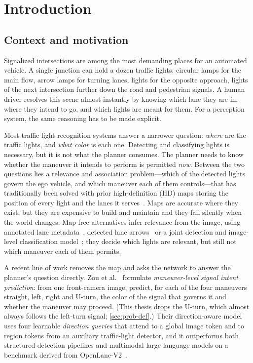 \chapter*{Introduction}

\section*{Context and motivation}

Signalized intersections are among the most demanding places for an automated vehicle. A single
junction can hold a dozen traffic lights: circular lamps for the main flow, arrow lamps for turning
lanes, lights for the opposite approach, lights of the next intersection further down the road and
pedestrian signals. A human driver resolves this scene almost instantly by knowing which lane they are
in, where they intend to go, and which lights are meant for them. For a perception system, the same
reasoning has to be made explicit.

Most traffic light recognition systems answer a narrower question: \emph{where} are the traffic
lights, and \emph{what color} is each one. Detecting and classifying lights is necessary, but it is not
what the planner consumes. The planner needs to know whether the maneuver it intends to perform is
permitted \emph{now}. Between the two questions lies a relevance and association problem---which of
the detected lights govern the ego vehicle, and which maneuver each of them controls---that has
traditionally been solved with prior high-definition (HD) maps storing the position of every light and
the lanes it serves~\cite{fairfield2011traffic,possatti2019traffic,polley2025atlas}. Maps are accurate
where they exist, but they are expensive to build and maintain and they fail silently when the world
changes. Map-free alternatives infer relevance from the image, using annotated lane
metadata~\cite{langenberg2019deep}, detected lane arrows~\cite{polley2024tldready} or a joint
detection and image-level classification model~\cite{trinci2026color}; they decide which lights are
relevant, but still not which maneuver each of them permits.

A recent line of work removes the map and asks the network to answer the planner's question directly.
Zou et al.~\cite{zou2026oneperception} formulate \emph{maneuver-level signal intent prediction}: from
one front-camera image, predict, for each of the four maneuvers straight, left, right and U-turn, the
color of the signal that governs it and whether the maneuver may proceed. (This thesis drops the U-turn,
which almost always follows the left-turn signal; \cref{sec:prob-def}.) Their direction-aware model
uses four learnable \emph{direction queries} that attend to a global image token and to region tokens
from an auxiliary traffic-light detector, and it outperforms both structured detection pipelines and
multimodal large language models on a benchmark derived from OpenLane-V2~\cite{wang2023openlanev2}.

